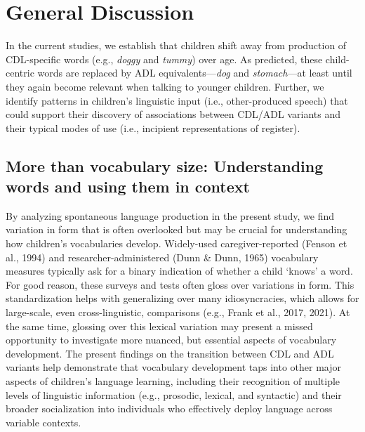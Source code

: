 \documentclass[10pt, letterpaper]{article}
\begin{document}
\hypertarget{general-discussion}{%
\section{General Discussion}\label{general-discussion}}

In the current studies, we establish that children shift away from
production of CDL-specific words (e.g., \emph{doggy} and \emph{tummy})
over age. As predicted, these child-centric words are replaced by ADL
equivalents---\emph{dog} and \emph{stomach}---at least until they again
become relevant when talking to younger children. Further, we identify
patterns in children's linguistic input (i.e., other-produced speech)
that could support their discovery of associations between CDL/ADL
variants and their typical modes of use (i.e., incipient representations
of register).

\hypertarget{more-than-vocabulary-size-understanding-words-and-using-them-in-context}{%
\subsection{More than vocabulary size: Understanding words and using
them in
context}\label{more-than-vocabulary-size-understanding-words-and-using-them-in-context}}

By analyzing spontaneous language production in the present study, we
find variation in form that is often overlooked but may be crucial for
understanding how children's vocabularies develop. Widely-used
caregiver-reported (Fenson et al., 1994) and researcher-administered
(Dunn \& Dunn, 1965) vocabulary measures typically ask for a binary
indication of whether a child `knows' a word. For good reason, these
surveys and tests often gloss over variations in form. This
standardization helps with generalizing over many idiosyncracies, which
allows for large-scale, even cross-linguistic, comparisons (e.g., Frank
et al., 2017, 2021). At the same time, glossing over this lexical
variation may present a missed opportunity to investigate more nuanced,
but essential aspects of vocabulary development. The present findings on
the transition between CDL and ADL variants help demonstrate that
vocabulary development taps into other major aspects of children's
language learning, including their recognition of multiple levels of
linguistic information (e.g., prosodic, lexical, and syntactic) and
their broader socialization into individuals who effectively deploy
language across variable contexts.
\end{document}
